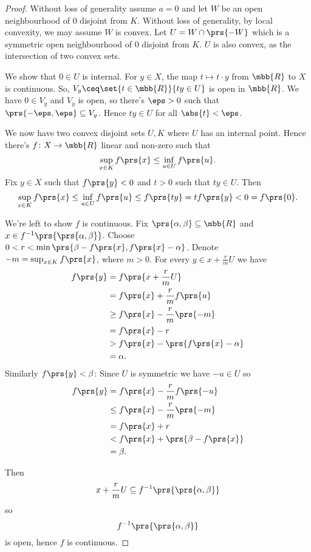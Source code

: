 \documentclass[10pt, twoside]{book}
\begin{document}
\begin{proof}
Without loss of generality assume $a = 0$ and let $W$ be an open neighbourhood of $0$ disjoint from $K$. Without loss of generality, by local convexity, we may assume $W$ is convex. Let $U = W \cap \prs{-W}$ which is a symmetric open neighbourhood of $0$ disjoint from $K$. $U$ is also convex, as the intersection of two convex sets.

We show that $0 \in U$ is internal. For $y \in X$, the map $t \mapsto t\cdot y$ from $\mbb{R}$ to $X$ is continuous. So, $V_y \ceq \set{t \in \mbb{R}}{ty \in U}$ is open in $\mbb{R}$. We have $0 \in V_y$ and $V_y$ is open, so there's $\eps > 0$ such that $\prs{-\eps,\eps} \subseteq V_y$. Hence $ty \in U$ for all $\abs{t} < \eps$.

We now have two convex disjoint sets $U,K$ where $U$ has an internal point. Hence there's $f \colon X \to \mbb{R}$ linear and non-zero such that
\[\sup_{x \in K} f\prs{x} \leq \inf_{u \in U} f\prs{u} \text{.}\]
Fix $y \in X$ such that $f\prs{y} < 0$ and $t > 0$ such that $ty \in U$. Then
\[\sup_{x \in K} f\prs{x} \leq \inf_{u \in U} f\prs{u} \leq f\prs{ty} = t f\prs{y} < 0 = f\prs{0} \text{.}\]

We're left to show $f$ is continuous.
Fix $\prs{\alpha,\beta} \subseteq \mbb{R}$ and $x \in f^{-1}\prs{\prs{\alpha,\beta}}$.
Choose $0 < r < \min\prs{\beta - f\prs{x}, f\prs{x} - \alpha}$. Denote $-m = \sup_{x \in K} f\prs{x}$, where $m > 0$.
For every $y \in x + \frac{r}{m} U$ we have
\begin{align*}
f\prs{y} &= f\prs{x + \frac{r}{m} U}
\\&= f\prs{x} + \frac{r}{m} f\prs{u}
\\&\geq f\prs{x} - \frac{r}{m} \prs{-m}
\\&= f\prs{x} - r
\\&> f\prs{x} - \prs{f\prs{x} - \alpha}
\\&= \alpha \text{.}
\end{align*}
Similarly $f\prs{y} < \beta$: Since $U$ is symmetric we have $-u \in U$ so
\begin{align*}
f\prs{y} &= f\prs{x} - \frac{r}{m} f\prs{-u}
\\&\leq f\prs{x} - \frac{r}{m} \prs{-m}
\\&= f\prs{x} + r
\\&< f\prs{x} + \prs{\beta - f\prs{x}}
\\&= \beta \text{.}
\end{align*}

Then
\[x + \frac{r}{m} U \subseteq f^{-1}\prs{\prs{\alpha,\beta}}\]
so
\[f^{-1}\prs{\prs{\alpha,\beta}}\]
is open, hence $f$ is continuous.
\end{proof}
\end{document}
